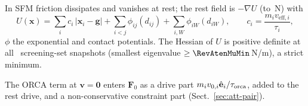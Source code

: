 In SFM friction dissipates and vanishes at rest; the rest field is $-\nabla U$ (to \ResidAllMax\,N) with
\begin{equation}\label{eq:U}
U(\mathbf{x})=\sum_i c_i\,|\mathbf{x}_i-\mathbf{g}|+\sum_{i<j}\phi_{ij}(d_{ij})+\sum_{i,W}\phi_{iW}(d_{iW}),\qquad c_i=\frac{m_iv_{\mathrm{eff},i}}{\tau_i},
\end{equation}
$\phi$ the exponential and contact potentials. The Hessian of $U$ is positive definite at all \RevAtenStrict\ screening-set snapshots (smallest eigenvalue $\ge\RevAtenMuMin$\,N/m), a strict minimum.

The ORCA term at $\mathbf{v}=\mathbf{0}$ enters $\mathbf{F}_0$ as a drive part $m_iv_{0,i}\hat{\mathbf e}_i/\tau_{\rm orca}$, added to the rest drive, and a non-conservative constraint part (Sect.~\ref{sec:att-pair}).

